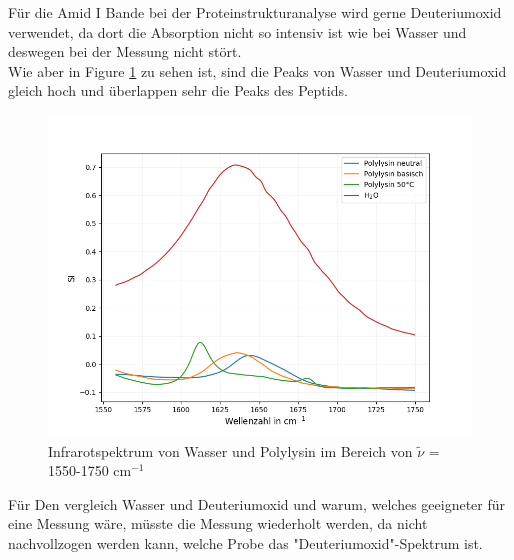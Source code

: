 \documentclass[10pt,a4paper]{article}
\begin{document}
			Für die Amid I Bande bei der Proteinstrukturanalyse wird gerne Deuteriumoxid verwendet, da dort die Absorption nicht so intensiv ist wie bei Wasser und deswegen bei der Messung nicht stört.\\
			Wie aber in Figure \ref{fig:water_polylysin_full} zu sehen ist, sind die Peaks von Wasser und Deuteriumoxid gleich hoch und überlappen sehr die Peaks des Peptids.\\
			
			\begin{figure}[H]
				\centering
				\includegraphics[scale=0.55]{water_polylysin.png}
				\caption{Infrarotspektrum von Wasser und Polylysin im Bereich von $\tilde{\nu}$ = 1550-1750 cm$^{-1}$}
				\label{fig:water_polylysin_full}
			\end{figure}
			
			Für Den vergleich Wasser und Deuteriumoxid und warum, welches geeigneter für eine Messung wäre, müsste die Messung wiederholt werden, da nicht nachvollzogen werden kann, welche Probe das "Deuteriumoxid"-Spektrum ist.
			
\end{document}
